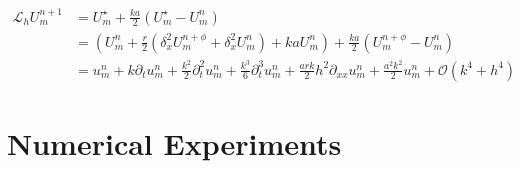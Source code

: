 \begin{align*}
  \mathcal{L}_h U_m^{n+1} & = U_m^\star + \tfrac{ka}{2} \left( U_m^\star - U_m^n \right)                                                                                                                                 \\
                          & = \left(U_m^n + \frac{r}{2} \left( \delta_x^2 U_m^{n+\phi} + \delta_x^2 U_m^n \right) + k a U_m^n\right) + \tfrac{ka}{2} \left( U_m^{n+\phi} - U_m^n \right)                                 \\
                          & = u_m^n + k\partial_t u_m^n + \tfrac{k^2}{2}\partial_t^2 u_m^n + \tfrac{k^3}{6}\partial_t^3 u_m^n + \tfrac{ark}{2}h^2\partial_{xx} u_m^n + \tfrac{a^2k^2}{2}u_m^n + \mathcal{O}(k^4+h^4)
\end{align*}

\section{\color{red} Numerical Experiments}